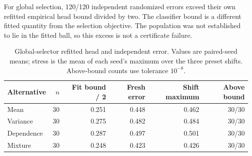 \documentclass[11pt,a4paper]{article}
\begin{document}
For global selection, 120/120 independent randomized errors exceed their own refitted empirical head bound divided by two. The classifier bound is a different fitted quantity from the selection objective. The population was not established to lie in the fitted ball, so this excess is not a certificate failure.
\begin{table}[tbp]\centering\small\setlength{\tabcolsep}{3.5pt}
\caption{Global-selector refitted head and independent error. Values are paired-seed means; stress is the mean of each seed's maximum over the three preset shifts. Above-bound counts use tolerance $10^{-8}$.}\label{tab:head}
\begin{tabularx}{\linewidth}{@{}p{22mm}rrrrr@{}}
\toprule Alternative & $n$ & Fit bound / 2 & Fresh error & Shift maximum & Above bound \\
\midrule
Mean & 30 & 0.251 & 0.448 & 0.462 & 30/30 \\
Variance & 30 & 0.275 & 0.482 & 0.484 & 30/30 \\
Dependence & 30 & 0.287 & 0.497 & 0.501 & 30/30 \\
Mixture & 30 & 0.248 & 0.423 & 0.426 & 30/30 \\
\bottomrule\end{tabularx}\end{table}
\end{document}
